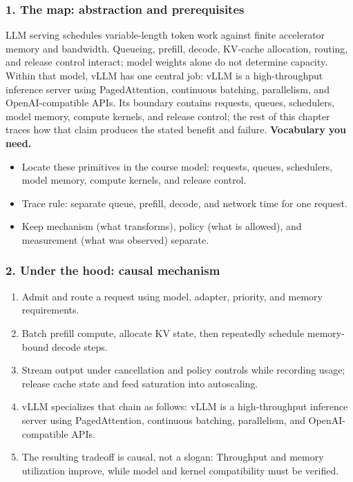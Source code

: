 \subsubsection*{1. The map: abstraction and prerequisites}
LLM serving schedules variable-length token work against finite accelerator memory and bandwidth. Queueing, prefill, decode, KV-cache allocation, routing, and release control interact; model weights alone do not determine capacity.
Within that model, vLLM has one central job: vLLM is a high-throughput inference server using PagedAttention, continuous batching, parallelism, and OpenAI-compatible APIs. Its boundary contains requests, queues, schedulers, model memory, compute kernels, and release control; the rest of this chapter traces how that claim produces the stated benefit and failure.
\textbf{Vocabulary you need.}\begin{itemize}
\item Locate these primitives in the course model: requests, queues, schedulers, model memory, compute kernels, and release control.
\item Trace rule: separate queue, prefill, decode, and network time for one request.
\item Keep mechanism (what transforms), policy (what is allowed), and measurement (what was observed) separate.
\end{itemize}
\subsubsection*{2. Under the hood: causal mechanism}\begin{enumerate}
\item Admit and route a request using model, adapter, priority, and memory requirements.
\item Batch prefill compute, allocate KV state, then repeatedly schedule memory-bound decode steps.
\item Stream output under cancellation and policy controls while recording usage; release cache state and feed saturation into autoscaling.
\item vLLM specializes that chain as follows: vLLM is a high-throughput inference server using PagedAttention, continuous batching, parallelism, and OpenAI-compatible APIs.
\item The resulting tradeoff is causal, not a slogan: Throughput and memory utilization improve, while model and kernel compatibility must be verified.
\end{enumerate}
